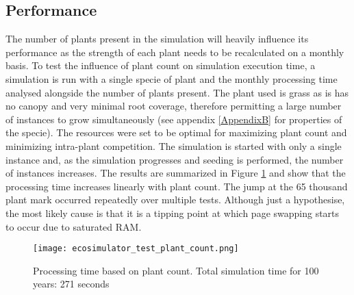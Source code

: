 \subsection{Performance} \label{subsec:ecosytem_performance}

The number of plants present in the simulation will heavily influence its performance as the strength of each plant needs to be recalculated on a monthly basis. To test the influence of plant count on simulation execution time, a simulation is run with a single specie of plant and the monthly processing time analysed alongside the number of plants present. The plant used is grass as is has no canopy and very minimal root coverage, therefore permitting a large number of instances to grow simultaneously (see appendix \ref{AppendixB} for properties of the specie). The resources were set to be optimal for maximizing plant count and minimizing intra-plant competition. The simulation is started with only a single instance and, as the simulation progresses and seeding is performed, the number of instances increases. The results are summarized in Figure \ref{fig:ecosimulator_test_plant_count} and show that the processing time increases linearly with plant count. The jump at the 65 thousand plant mark occurred repeatedly over multiple tests. Although just a hypothesise, the most likely cause is that it is a tipping point at which page swapping starts to occur due to saturated RAM.\\

\begin{figure}
\center
	\texttt{[image: ecosimulator\_test\_plant\_count.png]}
	\caption{ Processing time based on plant count. Total simulation time for 100 years: 271 seconds}	
	\label{fig:ecosimulator_test_plant_count}
\end{figure}

